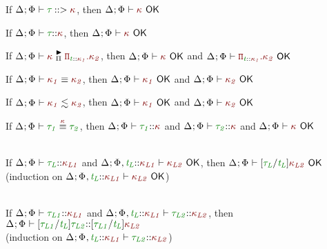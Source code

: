 \documentclass[11pt]{article}
\begin{document}
    \begin{lemma}[OK-PK]
        If $\PrincipalKind{\typ}$, then $\KindWellFormed$
    \end{lemma}
    \begin{lemma}[OK-WFaK]
        If $\WellFormedAtKind{\typ}$, then $\KindWellFormed$
    \end{lemma}
    \begin{lemma}[OK-MatchPi]
        If $\MatchedPiKind{\knd}$, then $\KindWellFormed$ and $\KindWellFormed[\DepFunKind]$
    \end{lemma}
    \begin{lemma}[OK-KEquiv]
        If $\KindEquiv{\knd[1]}{\knd[2]}$, then $\KindWellFormed[{\knd[1]}]$ and $\KindWellFormed[{\knd[2]}]$
    \end{lemma}
    \begin{lemma}[OK-CSK]
        If $\ConsistentSubKind{\knd[1]}{\knd[2]}$, then $\KindWellFormed[{\knd[1]}]$ and $\KindWellFormed[{\knd[2]}]$
    \end{lemma}
    \begin{lemma}[OK-EquivAK]
        If $\TypeEquivAtKind{\typ[1]}{\typ[2]}$, then $\WellFormedAtKind{\typ[1]}$ and $\WellFormedAtKind{\typ[2]}$ and $\KindWellFormed$
    \end{lemma}
    \begin{lemma}[OK-Substitution]
        \vphantom{.}\\
        If $\WellFormedAtKind{\typ[L]}[\knd[L1]]$ and $\KindWellFormed[{\knd[L2]}][\HoleCtx\ExtendTypVarCtx[][L][{\knd[L1]}]]$, then $\KindWellFormed[\subst{\typ[L]}{\typvar[L]}{\knd[L2]}]$ \\
        (induction on $\KindWellFormed[{\knd[L2]}][\HoleCtx\ExtendTypVarCtx[][L][{\knd[L1]}]]$)
    \end{lemma}
    \begin{lemma}[K-Substitution]
        \vphantom{.}\\
        If $\WellFormedAtKind{\typ[L1]}[\knd[L1]]$ and $\WellFormedAtKind[\HoleCtx\ExtendTypVarCtx[][L][{\knd[L1]}]]{\typ[L2]}[\knd[L2]]$, then $\WellFormedAtKind{\subst{\typ[L1]}{\typvar[L]}{\typ[L2]}}[\subst{\typ[L1]}{\typvar[L]}{\knd[L2]}]$ \\
        (induction on $\WellFormedAtKind[\HoleCtx\ExtendTypVarCtx[][L][{\knd[L1]}]]{\typ[L2]}[\knd[L2]]$)
    \end{lemma}
\end{document}
